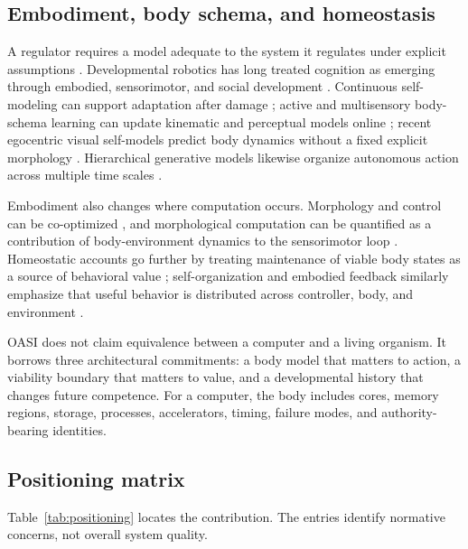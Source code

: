 \documentclass[journal,10pt]{IEEEtran}
\newcommand{\OASI}{\textsc{OASI}}
\begin{document}
\subsection{Embodiment, body schema, and homeostasis}
A regulator requires a model adequate to the system it regulates under explicit assumptions \cite{conant1970regulator}. Developmental robotics has long treated cognition as emerging through embodied, sensorimotor, and social development \cite{asada2009cognitive}. Continuous self-modeling can support adaptation after damage \cite{bongard2006selfmodel}; active and multisensory body-schema learning can update kinematic and perceptual models online \cite{martinezcantin2010bodyschema,vicente2016online,pugach2019bodyschema}; recent egocentric visual self-models predict body dynamics without a fixed explicit morphology \cite{hu2025selfmodel}. Hierarchical generative models likewise organize autonomous action across multiple time scales \cite{yuan2023hierarchical}.

Embodiment also changes where computation occurs. Morphology and control can be co-optimized \cite{cheney2017morphology}, and morphological computation can be quantified as a contribution of body-environment dynamics to the sensorimotor loop \cite{zahedi2013morphological,ghazizahedi2015information}. Homeostatic accounts go further by treating maintenance of viable body states as a source of behavioral value \cite{man2019homeostasis}; self-organization and embodied feedback similarly emphasize that useful behavior is distributed across controller, body, and environment \cite{pfeifer2007selforganization}.

\OASI{} does not claim equivalence between a computer and a living organism. It borrows three architectural commitments: a body model that matters to action, a viability boundary that matters to value, and a developmental history that changes future competence. For a computer, the body includes cores, memory regions, storage, processes, accelerators, timing, failure modes, and authority-bearing identities.

\subsection{Positioning matrix}
Table~\ref{tab:positioning} locates the contribution. The entries identify normative concerns, not overall system quality.
\end{document}
